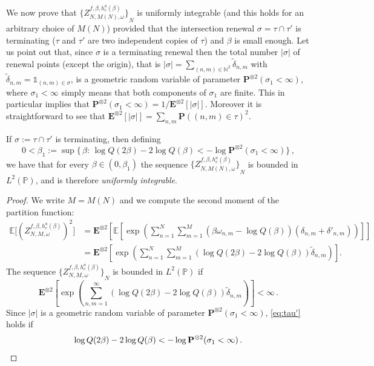 \documentclass[AHL,Unicode,longabstracts]{cedram}
\newcommand{\gb}{\beta}
\newcommand{\unbf}%
{\mathds{1}}
\renewcommand{\tilde}{\widetilde}
\newcommand{\bP}{\ensuremath{\mathbf{P}}}
\newcommand{\bE}{\ensuremath{\mathbf{E}}}
\newcommand{\bbE}{\ensuremath{\mathbb{E}}}
\newcommand{\bbN}{\ensuremath{\mathbb{N}}}
\newcommand{\bbP}{\ensuremath{\mathbb{P}}}
\begin{document}
We now prove that ${ \lbrace {Z^{f,\gb,h_c^{a}(\gb)}_{N,M(N),\omega}} \rbrace}_{N}$ is uniformly integrable (and this holds for an arbitrary choice of $M(N)$) provided that the intersection renewal $\sigma = \tau \cap \tau'$ is terminating ($\tau$ and $\tau'$ are two independent copies of $\tau$) and $\gb$ is small enough. Let us point out that, since $\sigma $ is a terminating renewal then the total number $\vert \sigma \vert$ of renewal points (except the origin), that is $\vert \sigma \vert= \sum_{(n,m)\in \bbN^2} \tilde \delta_{n,m}$ with $\tilde \delta_{n,m} = \unbf_{(n,m) \in \sigma}$, is a geometric random variable of parameter $\bP^{\otimes 2} (\sigma_1 < \infty)$, where $\sigma_1 < \infty$ simply means that both components of $\sigma_1$ are finite. This in particular implies that $\bP^{\otimes 2} (\sigma_1 < \infty) = 1/\bE^{\otimes 2} [\vert \sigma \vert]$. Moreover it is straightforward to see that $\bE^{\otimes 2} [\vert \sigma \vert]= \sum_{n,m} \bP((n,m) \in \tau)^2$.

\begin{lemm}\label{th:tau'}
If $\sigma:=\tau\cap \tau'$ is terminating, then defining
\begin{equation}\label{eq:beta1}
0< \beta_1 := \sup \Big\{\,\beta :\,\log Q(2 \beta) - 2 \log Q(\beta) < - \log \bP^{\otimes 2} (\sigma_1 < \infty) \Big\}\,,
\end{equation}
we have that for every $\beta \in (0,\beta_1)$ the sequence ${ \lbrace {Z^{f,\gb,h_c^a(\gb)}_{N,M(N),\omega}} \rbrace}_{N}$ is bounded in $L^2(\bbP)$, and is therefore \emph{uniformly integrable}.
\end{lemm}

\begin{proof}
We write $M=M(N)$ and we compute the second moment of the partition function:
\begin{equation}\label{eq:Z2}
\begin{split}
\bbE \Big[{ \left({Z_{N,M,\omega}^{f,\beta,h_c^a(\beta)}} \right) }^2 \Big] & =
\bE^{\otimes 2} \left[\bbE \left[\exp\! \left(\sum_{n=1}^N \sum_{m=1}^M (\beta \omega_{n,m} - \log Q(\beta)) (\delta_{n,m}+\delta'_{n,m}) \right) \right] \right] \\
& = \bE^{\otimes 2} \left[\exp \!\left(\sum_{n=1}^N \sum_{m=1}^M (\log Q(2 \beta) - 2 \log Q(\beta)) \tilde\delta_{n,m} \right) \right].
\end{split}
\end{equation}
The sequence ${ \lbrace Z_{N,M,\omega}^{f,\beta,h_c^a(\beta)} \rbrace}_{N}$ is bounded in $L^2(\bbP)$ if
\begin{equation}\label{eq:tau'}
\bE^{\otimes 2} \left[\exp \!\left(\sum_{n,m=1}^{\infty} (\log Q(2 \beta) - 2 \log Q(\beta)) \tilde\delta_{n,m} \right) \right] < \infty\,.
\end{equation}
Since $\vert \sigma \vert$ is a geometric random variable of parameter $\bP^{\otimes 2} (\sigma_1 < \infty)$, \eqref{eq:tau'} holds if
\begin{equation}
\log Q(2 \beta) - 2 \log Q(\beta) < - \log \bP^{\otimes 2} (\sigma_1 < \infty)
\,.\qedhere
\end{equation}
\end{proof}
\end{document}
